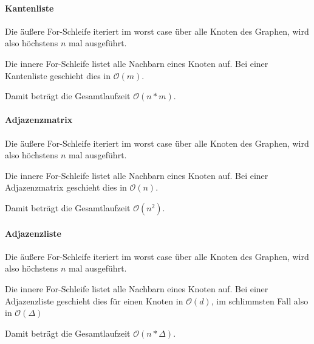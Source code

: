 \documentclass[12pt]{scrartcl}%
\theoremstyle{nonumberplain}
\newcommand{\bO}[1]{\mathcal O(#1)}
\begin{document}
\paragraph{Kantenliste}

Die äußere For-Schleife iteriert im worst case über alle Knoten des Graphen, wird also höchstens $n$ mal ausgeführt.

Die innere For-Schleife listet alle Nachbarn eines Knoten auf. Bei einer Kantenliste geschieht dies in $\bO{m}$.

Damit beträgt die Gesamtlaufzeit $\bO{n*m}$.

\paragraph{Adjazenzmatrix}

Die äußere For-Schleife iteriert im worst case über alle Knoten des Graphen, wird also höchstens $n$ mal ausgeführt.

Die innere For-Schleife listet alle Nachbarn eines Knoten auf. Bei einer Adjazenzmatrix geschieht dies in $\bO{n}$.

Damit beträgt die Gesamtlaufzeit $\bO{n^2}$.

\paragraph{Adjazenzliste}

Die äußere For-Schleife iteriert im worst case über alle Knoten des Graphen, wird also höchstens $n$ mal ausgeführt.

Die innere For-Schleife listet alle Nachbarn eines Knoten auf. Bei einer Adjazenzliste geschieht dies für einen Knoten in $\bO{d}$, im schlimmsten Fall also in $\bO{\Delta}$

Damit beträgt die Gesamtlaufzeit $\bO{n*\Delta}$.
\end{document}
